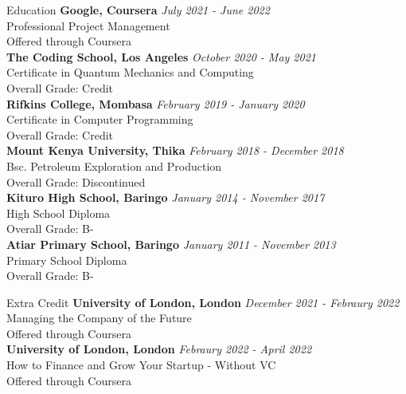 \documentclass[
	11pt, %
]{resume} %
\begin{document}
\begin{rSection}{Education}
	\textbf{Google, Coursera} \hfill \textit{July 2021 - June 2022} \\ 
	Professional Project Management \\
	Offered through Coursera \\
	\textbf{The Coding School, Los Angeles} \hfill \textit{October 2020 - May 2021} \\ 
	Certificate in Quantum Mechanics and Computing \\
	Overall Grade: Credit \\
	\textbf{Rifkins College, Mombasa} \hfill \textit{February 2019 - January 2020} \\ 
	Certificate in Computer Programming \\
	Overall Grade: Credit \\
	\textbf{Mount Kenya University, Thika} \hfill \textit{February 2018 - December 2018} \\ 
	Bsc. Petroleum Exploration and Production \\
	Overall Grade: Discontinued \\
	\textbf{Kituro High School, Baringo} \hfill \textit{January 2014 - November 2017} \\ 
	High School Diploma \\
	Overall Grade: B- \\
	\textbf{Atiar Primary School, Baringo} \hfill \textit{January 2011 - November 2013} \\ 
	Primary School Diploma \\
	Overall Grade: B-
	
\end{rSection}
\begin{rSection}{Extra Credit}
	\textbf{University of London, London} \hfill \textit{December 2021 - Febraury 2022} \\ 
	Managing the Company of the Future \\
	Offered through Coursera \\
	\textbf{University of London, London} \hfill \textit{Febraury 2022 - April 2022} \\ 
	How to Finance and Grow Your Startup - Without VC \\
	Offered through Coursera \\
\end{rSection}
\end{document}
